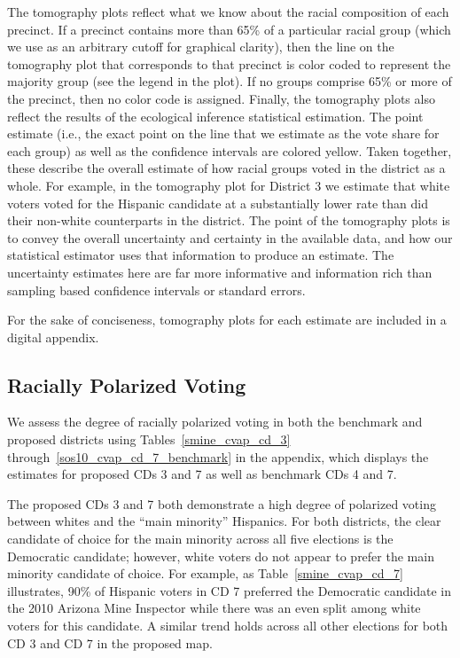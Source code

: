 \documentclass[12pt]{scrartcl}
\begin{document}
The tomography plots reflect what we know about the racial composition
of each precinct. If a precinct contains more than 65\% of a
particular racial group (which we use as an arbitrary cutoff for
graphical clarity), then the line on the tomography plot that
corresponds to that precinct is color coded to represent the majority
group (see the legend in the plot). If no groups comprise 65\% or more
of the precinct, then no color code is assigned.  Finally, the
tomography plots also reflect the results of the ecological inference
statistical estimation. The point estimate (i.e., the exact point on
the line that we estimate as the vote share for each group) as well as
the confidence intervals are colored yellow. Taken together, these
describe the overall estimate of how racial groups voted in the
district as a whole. For example, in the tomography plot for District
3 we estimate that white voters voted for the Hispanic candidate at a
substantially lower rate than did their non-white counterparts in the
district.  The point of the tomography plots is to convey the overall
uncertainty and certainty in the available data, and how our
statistical estimator uses that information to produce an estimate.
The uncertainty estimates here are far more informative and
information rich than sampling based confidence intervals or standard
errors.

For the sake of conciseness, tomography plots for each estimate are
included in a digital appendix.

\subsection{Racially Polarized Voting}
We assess the degree of racially polarized voting in both the benchmark and proposed districts using Tables~\ref{smine_cvap_cd_3} through~\ref{sos10_cvap_cd_7_benchmark} in the appendix, which displays the estimates for proposed CDs 3 and 7 as well as benchmark CDs 4 and 7. 

The proposed CDs 3 and 7 both demonstrate a high degree of polarized voting between whites and the ``main minority'' Hispanics. For both districts, the clear candidate of choice for the main minority across all five elections is the Democratic candidate; however, white voters do not appear to prefer the main minority candidate of choice. For example, as Table~\ref{smine_cvap_cd_7} illustrates, 90\% of Hispanic voters in CD 7 preferred the Democratic candidate in the 2010 Arizona Mine Inspector while there was an even split among white voters for this candidate. A similar trend holds across all other elections for both CD 3 and CD 7 in the proposed map.
\end{document}
